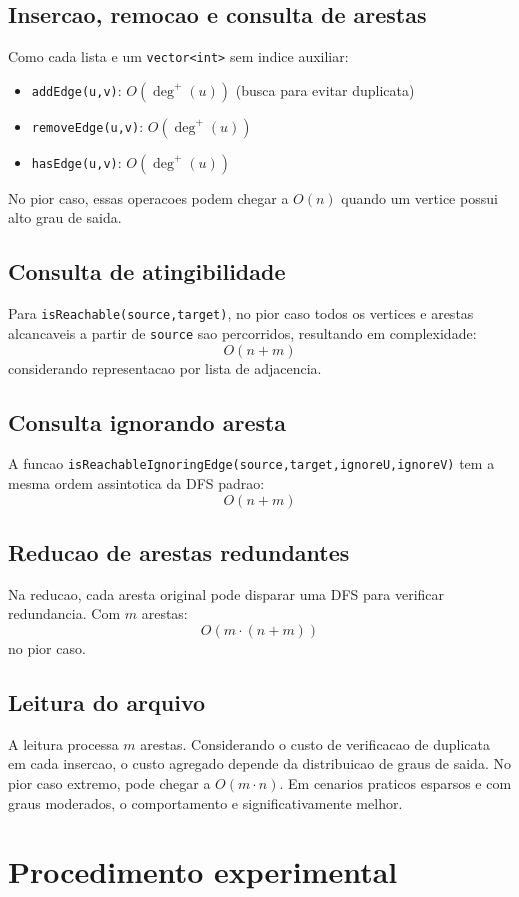 \documentclass[12pt,a4paper]{article}
\begin{document}
\subsection{Insercao, remocao e consulta de arestas}
Como cada lista e um \texttt{vector<int>} sem indice auxiliar:
\begin{itemize}
    \item \texttt{addEdge(u,v)}: $O(\deg^+(u))$ (busca para evitar duplicata)
    \item \texttt{removeEdge(u,v)}: $O(\deg^+(u))$
    \item \texttt{hasEdge(u,v)}: $O(\deg^+(u))$
\end{itemize}
No pior caso, essas operacoes podem chegar a $O(n)$ quando um vertice possui alto grau de saida.

\subsection{Consulta de atingibilidade}
Para \texttt{isReachable(source,target)}, no pior caso todos os vertices e arestas alcancaveis a partir de \texttt{source} sao percorridos, resultando em complexidade:
\[
O(n + m)
\]
considerando representacao por lista de adjacencia.

\subsection{Consulta ignorando aresta}
A funcao \texttt{isReachableIgnoringEdge(source,target,ignoreU,ignoreV)} tem a mesma ordem assintotica da DFS padrao:
\[
O(n + m)
\]

\subsection{Reducao de arestas redundantes}
Na reducao, cada aresta original pode disparar uma DFS para verificar redundancia. Com $m$ arestas:
\[
O(m\cdot(n+m))
\]
no pior caso.

\subsection{Leitura do arquivo}
A leitura processa $m$ arestas. Considerando o custo de verificacao de duplicata em cada insercao, o custo agregado depende da distribuicao de graus de saida. No pior caso extremo, pode chegar a $O(m\cdot n)$. Em cenarios praticos esparsos e com graus moderados, o comportamento e significativamente melhor.

\section{Procedimento experimental}
\end{document}
